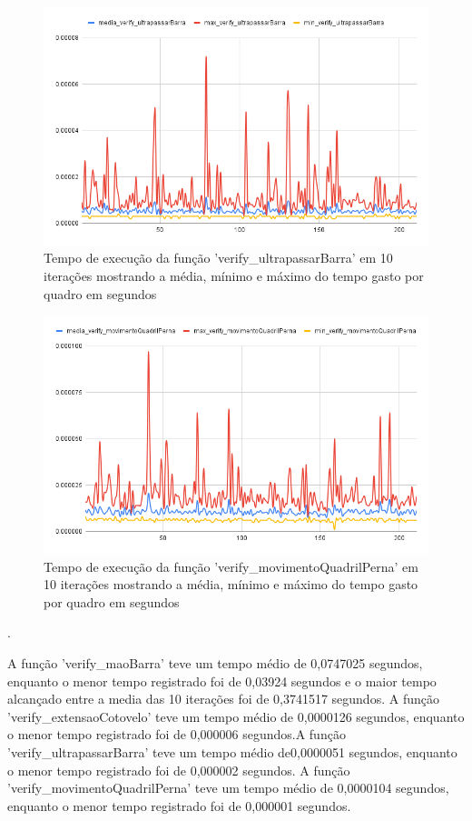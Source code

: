 \begin{figure}[!htb]
	\centering
	\includegraphics[scale=0.6]{figuras/grafico/ultrapassarBarra.png}
	\caption{Tempo de execução da função 'verify\_ultrapassarBarra' em 10 iterações mostrando a média, mínimo e máximo do tempo gasto por quadro em segundos}
\end{figure}

\begin{figure}[!htb]
	\centering
	\includegraphics[scale=0.6]{figuras/grafico/movimentoQuadril.png}
	\caption{Tempo de execução da função 'verify\_movimentoQuadrilPerna' em 10 iterações mostrando a média, mínimo e máximo do tempo gasto por quadro em segundos}
\end{figure}

.
\newpage

A função 'verify\_maoBarra' teve um tempo médio de 0,0747025 segundos, enquanto o menor tempo registrado foi de 0,03924 segundos e o maior tempo alcançado entre a media das 10 iterações foi de 0,3741517 segundos. A função 'verify\_extensaoCotovelo' teve um tempo médio de 0,0000126 segundos, enquanto o menor tempo registrado foi de 0,000006 segundos.A função 'verify\_ultrapassarBarra' teve um tempo médio de0,0000051 segundos, enquanto o menor tempo registrado foi de 0,000002 segundos. A função 'verify\_movimentoQuadrilPerna' teve um tempo médio de 0,0000104 segundos, enquanto o menor tempo registrado foi de 0,000001 segundos.



